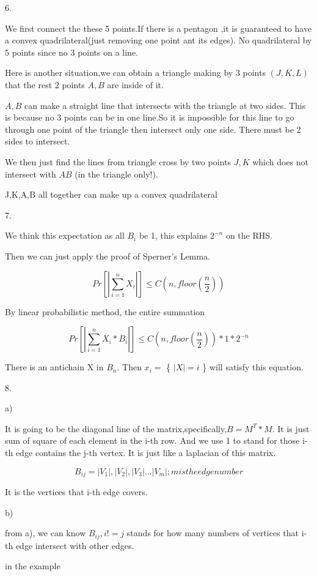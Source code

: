 \documentclass{article}
\begin{document}
6.

We first connect the these 5 points.If there is a pentagon ,it is guaranteed to have a convex quadrilateral(just removing one point ant its edges). No quadrilateral by 5 points since no 3 points on a line.

Here is another situation,we can obtain a triangle making by 3 points $(J,K,L)$ that the rest 2 points $A,B$ are inside of it.

$A,B$ can make a straight line that intersects with the triangle at two sides.
This is because no 3 points can be in one line.So it is impossible for this line to go through one point of the triangle then intersect only one side. There must be 2 sides to intersect.

We then just find the lines from triangle cross by two points $J,K$ which does not intersect with $AB$ (in the triangle only!).

J,K,A,B all together can make up a convex quadrilateral

7.

We think this expectation as all $B_i$ be 1,
this explains $2^{-n}$ on the RHS.

Then we can just apply the proof of Sperner’s Lemma.

$$Pr[|\sum_{i=1}^n X_i|] \leq C(n,floor(\frac{n}{2}))$$

By linear probabilistic method, the entire summation 

\begin{huge}
$$Pr[|\sum_{i=1}^n X_i* B_i|] \leq C(n,floor(\frac{n}{2}))* 1 * 2^{-n}$$
\end{huge}

There is an antichain X in $B_n$. Then
$x_i = $ \{ $|X|=i$ \} will satisfy this equation.

8.

a)

It is going to be the diagonal line of the matrix,specifically,$B = M^T*M$. It is just sum of square of each element in the i-th row. And we use 1 to stand for those i-th edge contains the j-th vertex. It is just like a laplacian of this matrix.

$$B_{ij}={|V_1|,|V_2|,|V_3|...|V_m|;m is the edge number}$$

It is the vertices that i-th edge covers.

b)

from a), we can know $B_{ij},i != j$ stands for how many numbers of vertices that i-th edge intersect with other edges.

in the example
\end{document}
